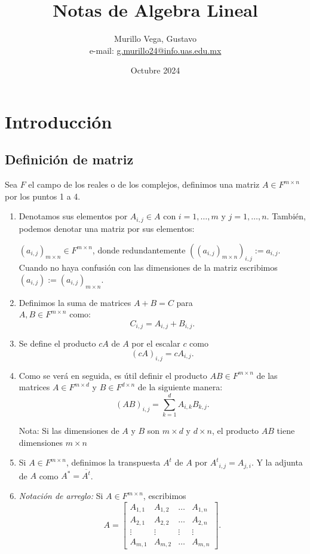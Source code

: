 \documentclass{article}
\title{Notas de Algebra Lineal}
\author{Murillo Vega, Gustavo \\ e-mail:
\href{mailto:g.murillo24@info.uas.edu.mx}{g.murillo24@info.uas.edu.mx}}
\date{Octubre 2024}
\begin{document}
\maketitle

\section{Introducción}
\subsection{Definición de matriz}
Sea ${F}$ el campo de los reales o de los complejos, definimos una matriz $A\in {F}^{m\times n}$ por los puntos 1 a 4.
\begin{enumerate}
    \item Denotamos sus elementos por $A_{i,j}\in A$ con  $i=1,\ldots,m$ y $j=1,\ldots,n$. También, podemos denotar una matriz por sus elementos:
    
    $(a_{i,j})_{m\times n} \in {F}^{m\times n}$, donde redundantemente $((a_{i,j})_{m\times n})_{i,j} := a_{i,j}$.\\
    Cuando no haya confusión con las dimensiones de la matriz
    escribimos\\ $(a_{i,j}) := (a_{i,j})_{m\times n}$.
    
    \item Definimos la suma de matrices $A+B = C$ para
    \\ $A, B \in {F}^{m\times n}$ como:
    $$C_{i,j}=A_{i,j} + B_{i,j}.$$

    \item Se define el producto $cA$ de $A$ por el escalar $c$
    como $$(cA)_{i,j} = cA_{i,j}.$$
    
    \item Como se verá en seguida, es útil definir el producto
    $AB\in {F}^{m\times n}$ de las matrices $A\in {F}^{m\times d}$ y
    $B \in {F}^{d\times n}$ de la siguiente manera:
    $$(AB)_{i,j} = \sum^d_{k=1} A_{i,k} B_{k,j}.$$
    
    Nota: Si las dimensiones de $A$ y $B$ son $m\times d$
    y $d\times n$, el producto $AB$ tiene dimensiones $m\times n$

    \item Si $A\in F^{m\times n}$, definimos la transpuesta $A^t$
    de $A$ por ${A^t}_{i,j} = A_{j,i}$.
    Y la adjunta de $A$ como $A^* = \overline{A^t}$.

    \item \textit{Notación de arreglo:} Si
    $A\in {F}^{m\times n}$, escribimos
    $$A = \begin{bmatrix}
        A_{1,1} & A_{1,2} & \ldots & A_{1, n} \\
        A_{2,1} & A_{2,2} & \ldots & A_{2, n} \\
        \vdots & \vdots & \vdots & \vdots \\
        A_{m,1} & A_{m,2} & \ldots & A_{m, n}
    \end{bmatrix}.$$
\end{enumerate}
\end{document}
